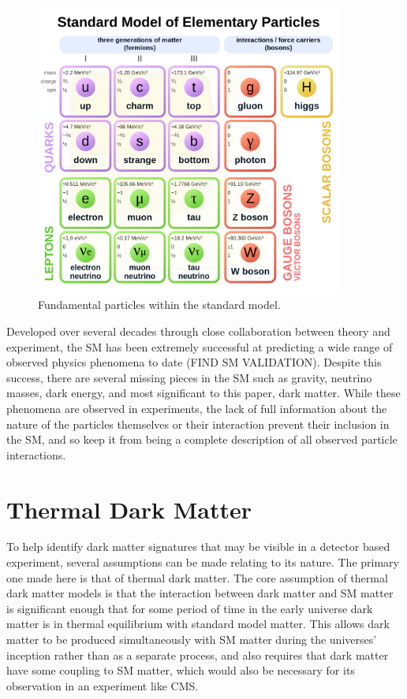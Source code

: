 \begin{figure}
	\includegraphics[width=0.9\textwidth]{figures/smParticles.pdf}
	\centering
	\caption{Fundamental particles within the standard model.}
	\label{fig:SM}
\end{figure}

Developed over several decades through close collaboration between theory and experiment, the SM has been extremely successful at predicting a wide range of observed physics phenomena to date (FIND SM VALIDATION).
Despite this success, there are several missing pieces in the SM such as gravity, neutrino masses, dark energy, and most significant to this paper, dark matter.
While these phenomena are observed in experiments, the lack of full information about the nature of the particles themselves or their interaction prevent their inclusion in the SM, and so keep it from being a complete description of all observed particle interactions.  

\section{Thermal Dark Matter}
To help identify dark matter signatures that may be visible in a detector based experiment, several assumptions can be made relating to its nature. 
The primary one made here is that of thermal dark matter.
The core assumption of thermal dark matter models is that the interaction between dark matter and SM matter is significant enough that for some period of time in the early universe dark matter is in thermal equilibrium with standard model matter.
This allows dark matter to be produced simultaneously with SM matter during the universes' inception rather than as a separate process, and also requires that dark matter have some coupling to SM matter, which would also be necessary for its observation in an experiment like CMS.

